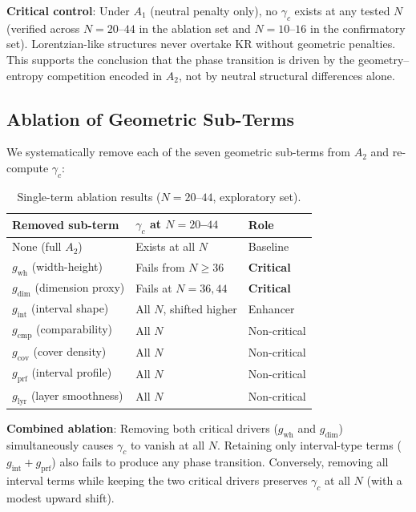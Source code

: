 \documentclass[11pt,a4paper]{article}
\begin{document}
\textbf{Critical control}: Under $A_1$ (neutral penalty only), no $\gamma_c$ exists at any tested $N$ (verified across $N = 20$--$44$ in the ablation set and $N = 10$--$16$ in the confirmatory set). Lorentzian-like structures never overtake KR without geometric penalties. This supports the conclusion that the phase transition is driven by the geometry--entropy competition encoded in $A_2$, not by neutral structural differences alone.

\subsection{Ablation of Geometric Sub-Terms}
\label{sec:ablation}

We systematically remove each of the seven geometric sub-terms from $A_2$ and re-compute $\gamma_c$:

\begin{table}[H]
\centering
\caption{Single-term ablation results ($N = 20$--$44$, exploratory set).}
\label{tab:ablation}
\begin{tabular}{lll}
\toprule
Removed sub-term & $\gamma_c$ at $N=20$--$44$ & Role \\
\midrule
None (full $A_2$) & Exists at all $N$ & Baseline \\
$g_{\text{wh}}$ (width-height) & Fails from $N \geq 36$ & \textbf{Critical} \\
$g_{\text{dim}}$ (dimension proxy) & Fails at $N = 36, 44$ & \textbf{Critical} \\
$g_{\text{int}}$ (interval shape) & All $N$, shifted higher & Enhancer \\
$g_{\text{cmp}}$ (comparability) & All $N$ & Non-critical \\
$g_{\text{cov}}$ (cover density) & All $N$ & Non-critical \\
$g_{\text{prf}}$ (interval profile) & All $N$ & Non-critical \\
$g_{\text{lyr}}$ (layer smoothness) & All $N$ & Non-critical \\
\bottomrule
\end{tabular}
\end{table}

\textbf{Combined ablation}: Removing both critical drivers ($g_{\text{wh}}$ and $g_{\text{dim}}$) simultaneously causes $\gamma_c$ to vanish at all $N$. Retaining only interval-type terms ($g_{\text{int}} + g_{\text{prf}}$) also fails to produce any phase transition. Conversely, removing all interval terms while keeping the two critical drivers preserves $\gamma_c$ at all $N$ (with a modest upward shift).
\end{document}
